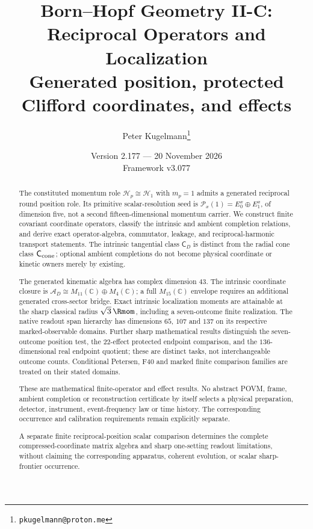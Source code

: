 \documentclass[12pt,a4paper]{article}
\title{\textbf{Born--Hopf Geometry II-C: Reciprocal Operators and Localization}\\[0.5em]
\large Generated position, protected Clifford coordinates, and effects}
\author{Peter Kugelmann\thanks{\texttt{pkugelmann@proton.me}}}
\date{Version 2.177 --- 20 November 2026 \\ Framework v3.077}
\begin{document}
\maketitle

\begin{abstract}
The constituted momentum role $\mathcal H_p\cong\mathcal H_1$ with
$m_p=1$ admits a generated reciprocal round position role. Its
primitive scalar-resolution seed is
$\mathcal P_x(1)=E_0^x\oplus E_1^x$, of dimension five, not a second
fifteen-dimensional momentum carrier. We construct finite covariant
coordinate operators, classify the intrinsic and ambient completion
relations, and derive exact operator-algebra, commutator, leakage,
and reciprocal-harmonic transport statements. The intrinsic tangential
class $\mathsf C_D$ is distinct from the radial cone class
$\mathsf C_{\rm cone}$; optional ambient completions do not become
physical coordinate or kinetic owners merely by existing.

The generated kinematic algebra has complex dimension $43$. The
intrinsic coordinate closure is
$\mathcal A_D\cong M_{11}(\mathbb C)\oplus M_4(\mathbb C)$;
a full $M_{15}(\mathbb C)$ envelope requires an additional generated
cross-sector bridge. Exact intrinsic localization moments are attainable
at the sharp classical radius $\sqrt3\,\Rmom$, including a seven-outcome
finite realization. The native readout span hierarchy has dimensions
$65$, $107$ and $137$ on its respective marked-observable domains.
Further sharp mathematical results distinguish the seven-outcome
position test, the $22$-effect protected endpoint comparison, and the
$136$-dimensional real endpoint quotient; these are distinct tasks,
not interchangeable outcome counts. Conditional Petersen, F40 and
marked finite comparison families are treated on their stated domains.

These are mathematical finite-operator and effect results. No abstract
POVM, frame, ambient completion or reconstruction certificate by itself
selects a physical preparation, detector, instrument, event-frequency
law or time history. The corresponding occurrence and calibration
requirements remain explicitly separate.

 A separate finite reciprocal-position scalar comparison determines the
complete compressed-coordinate matrix algebra and sharp one-setting
readout limitations, without claiming the corresponding apparatus,
coherent evolution, or scalar sharp-frontier occurrence.
\end{abstract}
\end{document}
